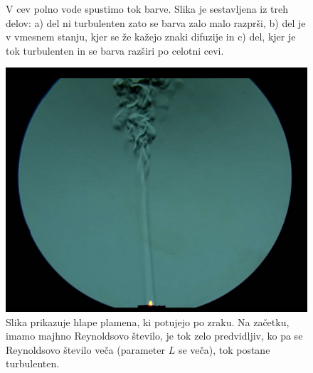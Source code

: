\documentclass[mat2, tisk]{fmfdelo}
\begin{document}
\begin{itemize}
\begin{figure}[h!]
\caption{V cev polno vode spustimo tok barve. Slika je sestavljena iz treh delov: a) del ni turbulenten zato se barva zalo malo razprši,
b) del je v vmesnem stanju, kjer se že kažejo znaki difuzije in c) del, kjer je tok turbulenten in se barva razširi po celotni cevi.}
\label{fig:difus}
\end{figure}
\begin{figure}[h]
  \centering
\includegraphics[scale=0.19]{slike/Reynolds.jpeg}
\caption{Slika prikazuje hlape plamena, ki potujejo po zraku. Na začetku, imamo majhno Reynoldsovo število, je tok zelo predvidljiv,
ko pa se Reynoldsovo število veča (parameter $L$ se veča), tok postane turbulenten.}
\end{figure}
\end{itemize}
\end{document}
